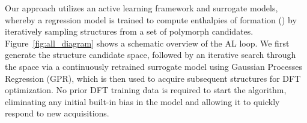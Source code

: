 %



%
%
Our approach utilizes an active learning framework and surrogate models,
whereby a regression model is trained to compute enthalpies of formation (\DHf) by iteratively sampling structures from a set of polymorph candidates.
%
Figure~\ref{fig:all_diagram} shows a schematic overview of the AL loop.
%
We first generate the structure candidate space, followed by an iterative search through the space via a continuously retrained surrogate model using Gaussian Processes Regression (GPR),
which is then used to acquire subsequent structures for DFT optimization.
%
No prior DFT training data is required to start the algorithm, eliminating any initial built-in bias in the model and allowing it to quickly respond to new acquisitions.


